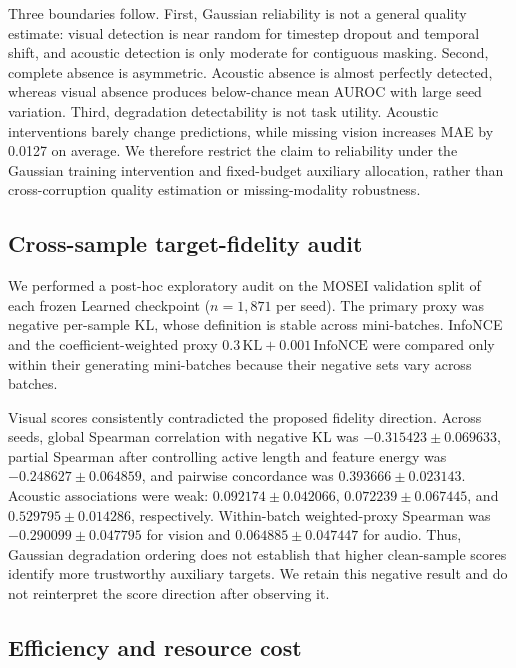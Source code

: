 Three boundaries follow. First, Gaussian reliability is not a general quality
estimate: visual detection is near random for timestep dropout and temporal
shift, and acoustic detection is only moderate for contiguous masking.
Second, complete absence is asymmetric. Acoustic absence is almost perfectly
detected, whereas visual absence produces below-chance mean AUROC with large
seed variation. Third, degradation detectability is not task utility.
Acoustic interventions barely change predictions, while missing vision
increases MAE by 0.0127 on average. We therefore restrict the claim to
reliability under the Gaussian training intervention and fixed-budget
auxiliary allocation, rather than cross-corruption quality estimation or
missing-modality robustness.

\subsection{Cross-sample target-fidelity
audit}\label{cross-sample-target-fidelity-audit}

We performed a post-hoc exploratory audit on the MOSEI validation split of
each frozen Learned checkpoint ($n=1{,}871$ per seed). The primary proxy was
negative per-sample KL, whose definition is stable across mini-batches.
InfoNCE and the coefficient-weighted proxy
$0.3\,\mathrm{KL}+0.001\,\mathrm{InfoNCE}$ were compared only within their
generating mini-batches because their negative sets vary across batches.

Visual scores consistently contradicted the proposed fidelity direction.
Across seeds, global Spearman correlation with negative KL was
$-0.315423\pm0.069633$, partial Spearman after controlling active length and
feature energy was $-0.248627\pm0.064859$, and pairwise concordance was
$0.393666\pm0.023143$. Acoustic associations were weak:
$0.092174\pm0.042066$, $0.072239\pm0.067445$, and
$0.529795\pm0.014286$, respectively. Within-batch weighted-proxy Spearman was
$-0.290099\pm0.047795$ for vision and $0.064885\pm0.047447$ for audio. Thus,
Gaussian degradation ordering does not establish that higher clean-sample
scores identify more trustworthy auxiliary targets. We retain this negative
result and do not reinterpret the score direction after observing it.

\subsection{Efficiency and resource cost}\label{efficiency-audit}

